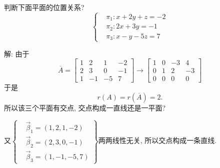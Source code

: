 \begin{eg}
判断下面平面的位置关系?
\begin{displaymath}\left\{\begin{aligned}
&\pi_1:x+2y+z=-2\\
&\pi_2:2x+3y=-1\\
&\pi_3:x-y-5z=7\end{aligned}\right.\end{displaymath}

解: 由于
\begin{displaymath}
\overline{A}=\begin{bmatrix}1&2&1&-2\\2&3&0&-1\\1&-1&-5&7\end{bmatrix}\rightarrow\begin{bmatrix}
1&0&-3&4\\0&1&2&-3\\0&0&0&0\end{bmatrix}\end{displaymath}
于是$$r(A)=r(\overline{A})=2.$$
所以该三个平面有交点, 交点构成一直线还是一平面?

又$\left\{\begin{aligned}&\vec{\beta}_1=(1,2,1,-2)\\&\vec{\beta}_2=(2,3,0,-1)\\&
\vec{\beta}_3=(1,-1,-5,7)\end{aligned}\right\}$两两线性无关, 所以交点构成一条直线.

\end{eg}

